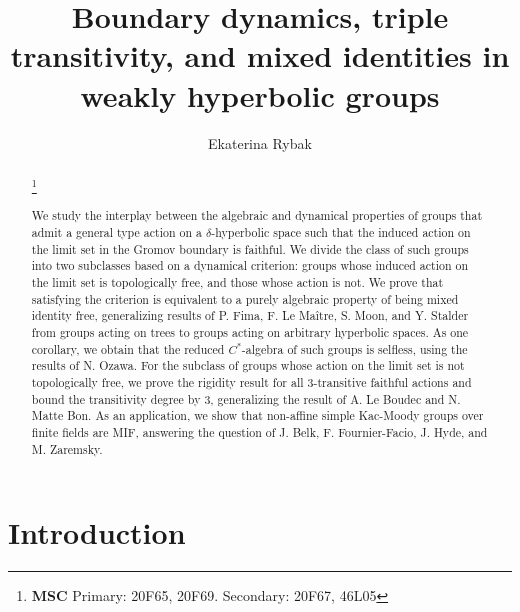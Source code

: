 \documentclass[11pt,letterpaper]{article}
\title{Boundary dynamics, triple transitivity, and mixed identities in weakly hyperbolic groups}
\author{Ekaterina Rybak}
\date{}
\newcommand\blfootnote[1]{%
  \begingroup
  \renewcommand\thefootnote{}\footnote{#1}%
  \addtocounter{footnote}{-1}%
  \endgroup
}
\theoremstyle{definition}
\theoremstyle{remark}
\begin{document}
\maketitle
\vspace{-10mm}
\begin{abstract}\blfootnote{\textbf{MSC} Primary: 20F65, 20F69. Secondary: 20F67, 46L05}
We study the interplay between the algebraic and dynamical properties of groups that admit a general type action on a $\delta$-hyperbolic space such that the induced action on the limit set in the Gromov boundary is faithful. We divide the class of such groups into two subclasses based on a dynamical criterion: groups whose induced action on the limit set is topologically free, and those whose action is not. We prove that satisfying the criterion is equivalent to a purely algebraic property of being mixed identity free, generalizing results of P. Fima, F. Le Ma\^{i}tre, S. Moon, and Y. Stalder from groups acting on trees to groups acting on arbitrary hyperbolic spaces. As one corollary, we obtain that the reduced $C^*$-algebra of such groups is selfless, using the results of N. Ozawa. For the subclass of groups whose action on the limit set is not topologically free, we prove the rigidity result for all $3$-transitive faithful actions and bound the transitivity degree by $3$, generalizing the result of A. Le Boudec and N. Matte Bon. As an application, we show that non-affine simple Kac-Moody groups over finite fields are MIF, answering the question of J. Belk, F. Fournier-Facio, J. Hyde, and M. Zaremsky.
\end{abstract}



\tableofcontents

\section{Introduction}
\end{document}
